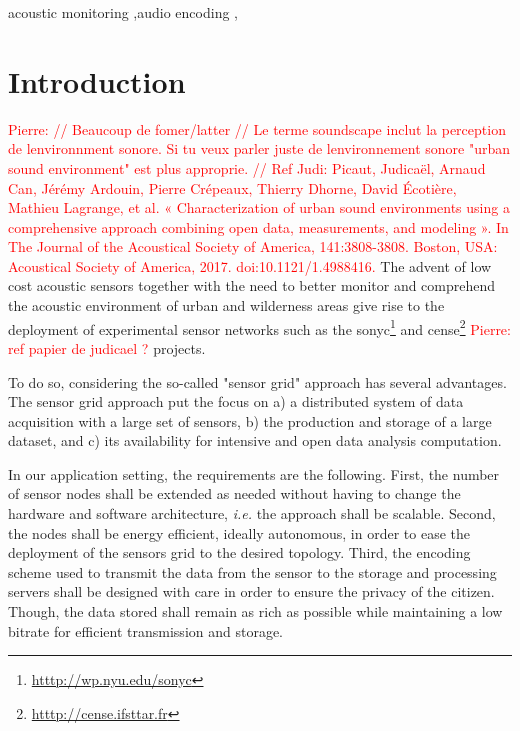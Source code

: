 \documentclass[final,3p,times,twocolumn]{elsarticle}
\newcommand{\pa}[1]{\textcolor{red}{ Pierre: #1}}
\begin{document}
\begin{frontmatter}
\begin{abstract}
\end{abstract}

\begin{keyword}

acoustic monitoring \sep audio encoding \sep



\end{keyword}

\end{frontmatter}

\clearpage
\section{Introduction}
\pa{
// Beaucoup de fomer/latter
// Le terme soundscape inclut la perception de lenvironnment sonore. Si tu veux parler juste de lenvironnement sonore "urban sound environment" est plus approprie.
// Ref Judi: Picaut, Judicaël, Arnaud Can, Jérémy Ardouin, Pierre Crépeaux, Thierry Dhorne, David Écotière, Mathieu Lagrange, et al. « Characterization of urban sound environments using a comprehensive approach combining open data, measurements, and modeling ». In The Journal of the Acoustical Society of America, 141:3808-3808. Boston, USA: Acoustical Society of America, 2017. doi:10.1121/1.4988416.
}
The advent of low cost acoustic sensors together with the need to better monitor and comprehend the acoustic environment of urban and wilderness areas give rise to the deployment of experimental sensor networks such as the sonyc\footnote{\url{htttp://wp.nyu.edu/sonyc}} \cite{mydlarz2017implementation} and cense\footnote{\url{htttp://cense.ifsttar.fr}} \pa{ref papier de judicael ?} \cite{} projects.

To do so, considering the so-called "sensor grid" approach  \cite{lim2005sensor,tham2005sensorgrid} has several advantages. The sensor grid approach put the focus on a) a distributed system of data acquisition with a large set of sensors, b) the production and storage of a large dataset, and c) its availability for intensive and open data analysis computation.

In our application setting, the requirements are the following. First,  the number of sensor nodes shall be extended as needed without having to change the hardware and software architecture, \textit{i.e.} the approach shall be scalable. Second, the nodes shall be energy efficient, ideally autonomous, in order to ease the deployment of the sensors grid to the desired topology. Third, the encoding scheme used to transmit the data from the sensor to the storage and processing servers shall be designed with care in order to ensure the privacy of the citizen. Though, the data stored shall remain as rich as possible while maintaining a low bitrate for efficient transmission and storage.
\end{document}
